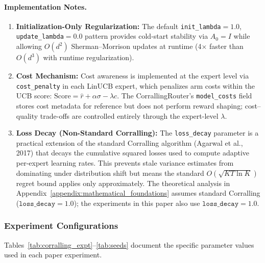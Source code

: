 \paragraph{Implementation Notes.}
\begin{enumerate}[leftmargin=*,noitemsep]
    \item \textbf{Initialization-Only Regularization:} The default
    \texttt{init\_lambda}$=1.0$, \texttt{update\_lambda}$=0.0$ pattern provides
    cold-start stability via $A_0 = I$ while allowing $O(d^2)$ Sherman--Morrison
    updates at runtime (4$\times$ faster than $O(d^3)$ with runtime regularization).

    \item \textbf{Cost Mechanism:} Cost awareness is implemented at the expert level
    via \texttt{cost\_penalty} in each LinUCB expert, which penalizes arm costs within
    the UCB score: $\text{Score} = \hat{r} + \alpha\sigma - \lambda c$.
    The CorrallingRouter's \texttt{model\_costs} field stores cost metadata for
    reference but does not perform reward shaping; cost--quality trade-offs are
    controlled entirely through the expert-level $\lambda$.

    \item \textbf{Loss Decay (Non-Standard Corralling):} The \texttt{loss\_decay}
    parameter is a practical extension of the standard Corralling algorithm
    (Agarwal et al., 2017) that decays the cumulative squared losses used to
    compute adaptive per-expert learning rates.  This prevents stale variance
    estimates from dominating under distribution shift but means the standard
    $O(\sqrt{K T \ln K})$ regret bound applies only approximately. The
    theoretical analysis in Appendix~\ref{appendix:mathematical_foundations}
    assumes standard Corralling ($\texttt{loss\_decay}=1.0$); the experiments
    in this paper also use $\texttt{loss\_decay}=1.0$.
\end{enumerate}


\subsubsection{Experiment Configurations}

Tables~\ref{tab:corralling_expt}--\ref{tab:seeds} document the specific parameter
values used in each paper experiment.

